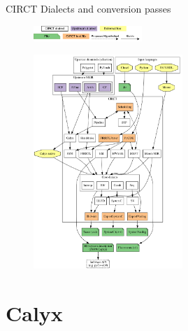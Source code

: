 \documentclass[8pt,a4paper,oneside,hidelinks,aspectratio=169,dvipsnames]{beamer}
\begin{document}
\begin{frame}{ CIRCT Dialects and conversion passes}
  \begin{figure}[H]
    \includegraphics[width=4.1cm,left]{img/circt-dialectlegend.png}
  \end{figure}
  \begin{figure}[H]
    \centering
    \vspace*{-1.1cm}
    \includegraphics[height=8.1cm]{img/circt-dialects.png}
  \end{figure}
\end{frame}

\section{Calyx}
\end{document}
